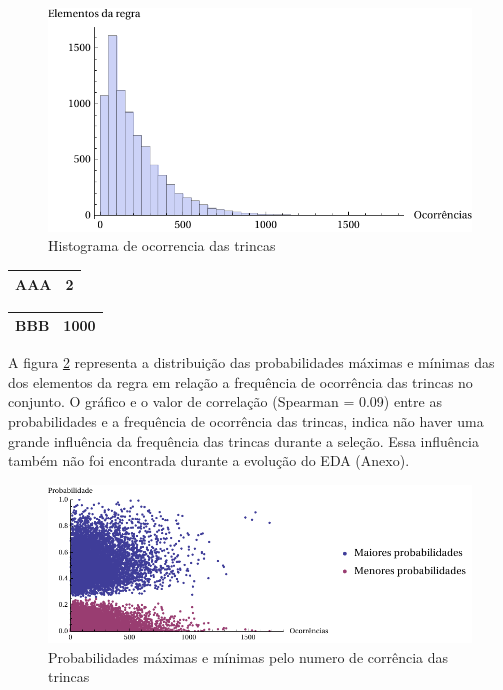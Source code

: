 \begin{figure}
  \centering
  \includegraphics[width=1\textwidth]{figures/histograma_occ.pdf}
  \caption{Histograma de ocorrencia das trincas}
        \label{fig:histograma_occ}
\end{figure}

\begin{tabular}{cc}
\hline
AAA&2\\
\hline
\end{tabular}
\quad
\begin{tabular}{cc}
\hline
BBB&1000\\
\hline
\end{tabular}


A figura \ref{fig:probG999_occXprob} representa a distribuição das probabilidades máximas e mínimas das dos elementos da regra em relação a frequência de ocorrência das trincas no conjunto. O gráfico e o valor de correlação (Spearman = 0.09) entre as probabilidades e a frequência de ocorrência das trincas,  indica não haver uma grande influência da frequência das trincas durante a seleção. Essa influência também não foi encontrada durante a evolução do EDA (Anexo).  

\begin{figure}
  \centering
  \includegraphics[width=1\textwidth]{figures/probG999_occXprob.pdf}
  \caption{Probabilidades máximas e mínimas pelo numero de corrência das trincas}
        \label{fig:probG999_occXprob}
\end{figure}


